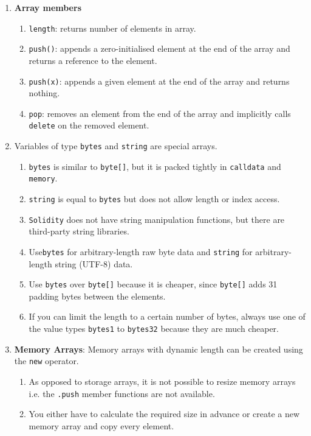 \begin{enumerate}
\item\textbf{Array members}
    \begin{enumerate}
    \item\verb|length|: returns number of elements in array.
    \item\verb|push()|: appends a zero-initialised element at the end of the array and returns a reference to the element.
    \item\verb|push(x)|:  appends a given element at the end of the array and returns nothing.
    \item\verb|pop|: removes an element from the end of the array and implicitly calls \verb|delete| on the removed element.
    \end{enumerate}

\item Variables of type \verb|bytes| and \verb|string| are special arrays.
    \begin{enumerate}
    \item\verb|bytes| is similar to \verb|byte[]|, but it is packed tightly in \verb|calldata| and \verb|memory|.
    \item\verb|string| is equal to \verb|bytes| but does not allow length or index access.
    \item\verb|Solidity| does not have string manipulation functions, but there are third-party string libraries.
    \item Use\verb|bytes| for arbitrary-length raw byte data and \verb|string| for arbitrary-length string (UTF-8) data.
    \item Use \verb|bytes| over \verb|byte[]| because it is cheaper, since \verb|byte[]| adds 31 padding bytes between the elements.
    \item If you can limit the length to a certain number of bytes, always use one of the value types \verb|bytes1| to \verb|bytes32| because they are much cheaper.
    \end{enumerate}

\item\textbf{Memory Arrays}: Memory arrays with dynamic length can be created using the \verb|new| operator.
    \begin{enumerate}
    \item As opposed to storage arrays, it is not possible to resize memory arrays i.e. the \verb|.push| member functions are not available.
    \item You either have to calculate the required size in advance or create a new memory array and copy every element.
    \end{enumerate}


\end{enumerate}
